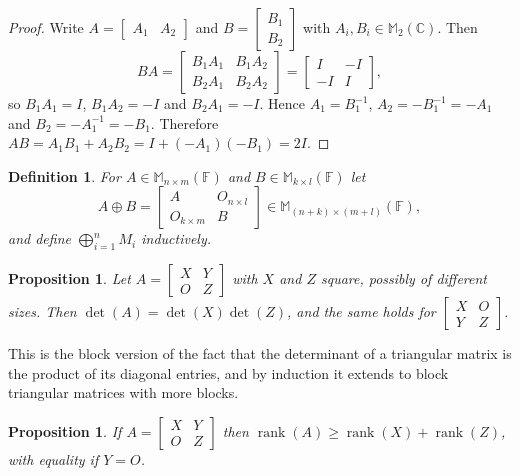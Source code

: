 \documentclass[12pt]{article}
\DeclareMathOperator{\Rank}{rank}
\theoremstyle{breakplain}
\newtheorem{prop}[theorem]{Proposition}
\theoremstyle{breakdef}
\newtheorem{definition}[theorem]{Definition}
\theoremstyle{remark}
\begin{document}
\begin{proof}
    Write $A=\begin{bmatrix}
        A_1 & A_2
    \end{bmatrix}$ and $B=\begin{bmatrix}
        B_1 \\ B_2
    \end{bmatrix}$ with $A_i,B_i\in \mathbb{M}_{2}(\mathbb{C})$. Then
    \[BA=\begin{bmatrix}
        B_1A_1 & B_1A_2\\
        B_2A_1 & B_2A_2
    \end{bmatrix}=\begin{bmatrix}
        I & -I\\
        -I & I
    \end{bmatrix},\]
    so $B_1A_1=I$, $B_1A_2=-I$ and $B_2A_1=-I$. Hence $A_1=B_1^{-1}$, $A_2=-B_1^{-1}=-A_1$ and $B_2=-A_1^{-1}=-B_1$. Therefore $AB=A_1B_1+A_2B_2=I+(-A_1)(-B_1)=2I$.
\end{proof}
\begin{definition}
    For $A\in\mathbb{M}_{n\times m}(\mathbb{F})$ and $B\in\mathbb{M}_{k\times l}(\mathbb{F})$ let
    \[A \oplus B=\begin{bmatrix}
        A & O_{n \times l}\\
        O_{k \times m} & B
    \end{bmatrix}\in\mathbb{M}_{(n+k)\times(m+l)}(\mathbb{F}),\]
    and define $\bigoplus_{i=1}^n M_i$ inductively.
\end{definition}
\begin{prop}
    Let $A=\begin{bmatrix}
        X & Y \\
        O & Z
    \end{bmatrix}$ with $X$ and $Z$ square, possibly of different sizes. Then $\det(A)=\det(X)\det(Z)$, and the same holds for $\begin{bmatrix}
        X & O \\
        Y & Z
    \end{bmatrix}$.
\end{prop}
This is the block version of the fact that the determinant of a triangular matrix is the product of its diagonal entries, and by induction it extends to block triangular matrices with more blocks.
\begin{prop}
    If $A=\begin{bmatrix}
        X & Y \\
        O & Z
    \end{bmatrix}$ then $\Rank(A)\geq \Rank(X)+\Rank(Z)$, with equality if $Y=O$.
\end{prop}
\end{document}
